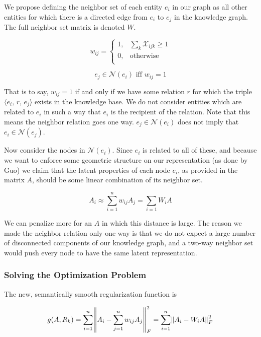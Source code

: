 \documentclass[pageno]{final_paper}
\begin{document}
We propose defining the neighbor set of each entity $e_i$ in our graph as all
other entities for which there is a directed edge from $e_i$ to $e_j$ in the
knowledge graph. The full neighbor set matrix is denoted $W$.

\begin{equation}
    \label{eq: new wij}
    w_{ij} =
    \begin{cases}
        1, & \sum_k \mathcal{X}_{ijk} \geq 1 \\
        0, & \text{otherwise} \\
    \end{cases}
\end{equation}

\begin{equation}
    \label{eq: new neighbor set}
    e_j \in \mathcal{N}(e_i) \text{ iff } w_{ij} = 1
\end{equation}

That is to say, $w_{ij} = 1$ if and only if we have some relation $r$ for which
the triple $\langle e_i,\,r,\,e_j \rangle$ exists in the knowledge base. We do
not consider entities which are related to $e_i$ in such a way that $e_i$ is the
recipient of the relation. Note that this means the neighbor relation goes one
way. $e_j \in \mathcal{N}(e_i)$ does not imply that $e_i \in \mathcal{N}(e_j)$.

Now consider the nodes in $\mathcal{N}(e_i)$. Since $e_i$ is related to all of
these, and because we want to enforce some geometric structure on our
representation (as done by Guo) we claim that the latent properties of each node
$e_i$, as provided in the matrix $A$, should be some linear combination of its
neighbor set.

$$ A_i \approx \sum_{i=1}^n w_{ij}A_j = \sum_{i=1} W_iA$$

We can penalize more for an $A$ in which this distance is large. The reason we
made the neighbor relation only one way is that we do not expect a large number
of disconnected components of our knowledge graph, and a two-way neighbor set
would push every node to have the same latent representation.

\subsubsection{Solving the Optimization Problem}
\label{Solving the Optimization Problem}

The new, semantically smooth regularization function is

\begin{equation}
    \label{eq: new g}
    g(A, R_k) = \sum_{i=1}^n \norm{A_i - \sum_{j=1}^n w_{ij}A_j}_F^2 =
    \sum_{i=1}^n \norm{A_i - W_iA}_F^2
\end{equation}
\end{document}
